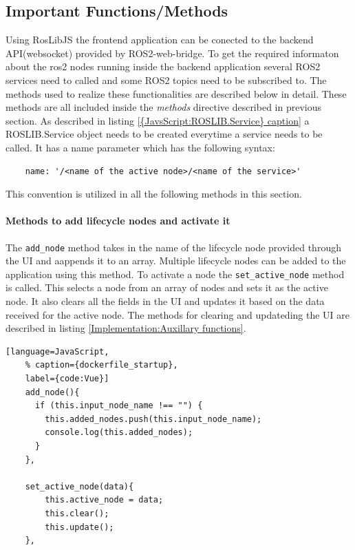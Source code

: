 \subsection{Important Functions/Methods}
\label{Implementation:ImportantFunctions}
Using RosLibJS the frontend application can be conected to the backend API(websocket) provided by ROS2-web-bridge. To get the required informaton about the ros2 nodes running inside the backend application several ROS2 services need to called and some ROS2 topics need to be subscribed to. The methods used to realize these functionalities are described below in detail. These methods are all included inside the \textit{methods} directive described in previous section. As described in listing \ref{{JavsScript:ROSLIB.Service} caption} a ROSLIB.Service object needs to be created everytime a service needs to be called. It has a name parameter which has the 
following syntax: 
\begin{lstlisting}
	name: '/<name of the active node>/<name of the service>'
\end{lstlisting}
This convention is utilized in all the following methods in this section.

\paragraph{Methods to add lifecycle nodes and activate it} The \lstinline{add_node} method takes in the name of the lifecycle node provided through the UI and aappends it to an array. Multiple lifecycle nodes can be added to the application using this method. To activate a node the \lstinline{set_active_node} method is called. This selects a node from an array of nodes and sets it as the active node. It also clears all the fields in the UI and updates it based on the data received for the active node. The methods for clearing and updateding the UI are described in listing \ref{Implementation:Auxillary functions}.
\begin{lstlisting}[language=JavaScript,
	% caption={dockerfile_startup}, 
	label={code:Vue}]
	add_node(){
	  if (this.input_node_name !== "") {
		this.added_nodes.push(this.input_node_name);
		console.log(this.added_nodes);
	  } 
	},

	set_active_node(data){
		this.active_node = data;
		this.clear();
		this.update();
	},
\end{lstlisting}



